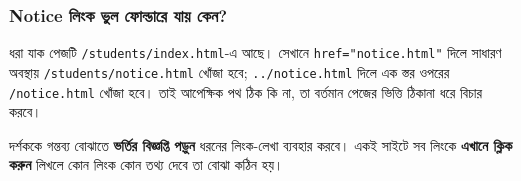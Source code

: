 \subsubsection{Notice লিংক ভুল ফোল্ডারে যায় কেন?}
ধরা যাক পেজটি \texttt{/students/index.html}-এ আছে। সেখানে \texttt{href="notice.html"} দিলে সাধারণ অবস্থায় \texttt{/students/notice.html} খোঁজা হবে; \texttt{../notice.html} দিলে এক স্তর ওপরের \texttt{/notice.html} খোঁজা হবে। তাই আপেক্ষিক পথ ঠিক কি না, তা বর্তমান পেজের ভিত্তি ঠিকানা ধরে বিচার করবে।

দর্শককে গন্তব্য বোঝাতে \textbf{ভর্তির বিজ্ঞপ্তি পড়ুন} ধরনের লিংক-লেখা ব্যবহার করবে। একই সাইটে সব লিংকে \textbf{এখানে ক্লিক করুন} লিখলে কোন লিংক কোন তথ্য দেবে তা বোঝা কঠিন হয়।
